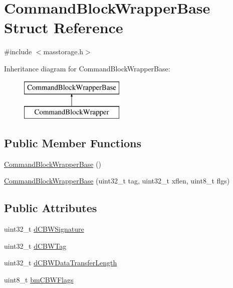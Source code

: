 \hypertarget{struct_command_block_wrapper_base}{\section{\-Command\-Block\-Wrapper\-Base \-Struct \-Reference}
\label{struct_command_block_wrapper_base}
}


{\ttfamily \#include $<$masstorage.\-h$>$}

\-Inheritance diagram for \-Command\-Block\-Wrapper\-Base\-:\begin{figure}[H]
\begin{center}
\leavevmode
\includegraphics[height=2.000000cm]{struct_command_block_wrapper_base}
\end{center}
\end{figure}
\subsection*{\-Public \-Member \-Functions}
\begin{DoxyCompactItemize}
\item 
\hyperlink{struct_command_block_wrapper_base_a48ae766ceb4fa43c7506e0f3b2982da0}{\-Command\-Block\-Wrapper\-Base} ()
\item 
\hyperlink{struct_command_block_wrapper_base_a4790cb74c1b2a0fd6bb73d46724a35e3}{\-Command\-Block\-Wrapper\-Base} (uint32\-\_\-t tag, uint32\-\_\-t xflen, uint8\-\_\-t flgs)
\end{DoxyCompactItemize}
\subsection*{\-Public \-Attributes}
\begin{DoxyCompactItemize}
\item 
uint32\-\_\-t \hyperlink{struct_command_block_wrapper_base_a133ffc8ac9be6ce284f10efece567748}{d\-C\-B\-W\-Signature}
\item 
uint32\-\_\-t \hyperlink{struct_command_block_wrapper_base_a0898a332eec2d598b80a896ff66d5549}{d\-C\-B\-W\-Tag}
\item 
uint32\-\_\-t \hyperlink{struct_command_block_wrapper_base_a62c537797107ada830b86e1f2d629164}{d\-C\-B\-W\-Data\-Transfer\-Length}
\item 
uint8\-\_\-t \hyperlink{struct_command_block_wrapper_base_a396b36ceef993c32f28b1354727a5e9e}{bm\-C\-B\-W\-Flags}
\end{DoxyCompactItemize}


